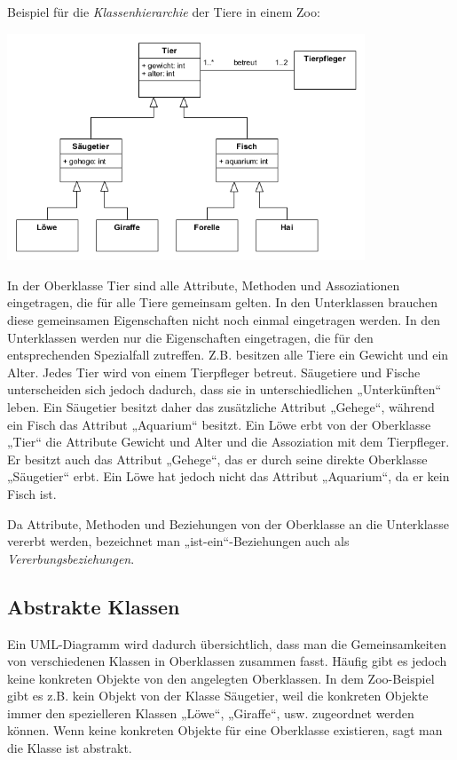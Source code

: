 Beispiel für die \emph{Klassenhierarchie} der Tiere in einem Zoo:

\begin{center}
\includegraphics[width=0.8\textwidth]{./inf/SEKII/15_UML_Klassendiagramme/Zoo.png}
\end{center}

In der Oberklasse Tier sind alle Attribute, Methoden und Assoziationen
eingetragen, die für alle Tiere gemeinsam gelten. In den Unterklassen brauchen
diese gemeinsamen Eigenschaften nicht noch einmal eingetragen werden. In den
Unterklassen werden nur die Eigenschaften eingetragen, die für den
entsprechenden Spezialfall zutreffen. Z.B. besitzen alle Tiere ein Gewicht und
ein Alter. Jedes Tier wird von einem Tierpfleger betreut. Säugetiere und Fische
unterscheiden sich jedoch dadurch, dass sie in unterschiedlichen „Unterkünften“
leben. Ein Säugetier besitzt daher das zusätzliche Attribut „Gehege“, während
ein Fisch das Attribut „Aquarium“ besitzt. Ein Löwe erbt von der Oberklasse
„Tier“ die Attribute Gewicht und Alter und die Assoziation mit dem Tierpfleger.
Er besitzt auch das Attribut „Gehege“, das er durch seine direkte Oberklasse
„Säugetier“ erbt. Ein Löwe hat jedoch nicht das Attribut „Aquarium“, da er kein
Fisch ist.

Da Attribute, Methoden und Beziehungen von der Oberklasse an die Unterklasse
vererbt werden, bezeichnet man „ist-ein“-Beziehungen auch als
\emph{Vererbungsbeziehungen}.


\subsection{Abstrakte Klassen}

Ein UML-Diagramm wird dadurch übersichtlich, dass man die Gemeinsamkeiten von
verschiedenen Klassen in Oberklassen zusammen fasst. Häufig gibt es jedoch
keine konkreten Objekte von den angelegten Oberklassen. In dem Zoo-Beispiel
gibt es z.B. kein Objekt von der Klasse Säugetier, weil die konkreten Objekte
immer den spezielleren Klassen „Löwe“, „Giraffe“, usw. zugeordnet werden
können. Wenn keine konkreten Objekte für eine Oberklasse existieren, sagt man
die Klasse ist abstrakt.